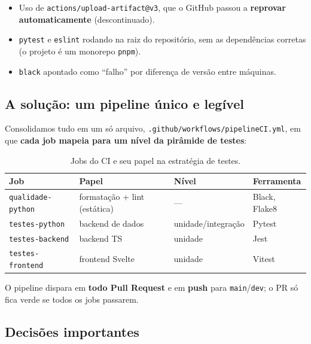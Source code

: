 \documentclass[11pt,a4paper]{article}
\begin{document}
\begin{itemize}[leftmargin=1.4em]
  \item Uso de \texttt{actions/upload-artifact@v3}, que o GitHub passou a
        \textbf{reprovar automaticamente} (descontinuado).
  \item \texttt{pytest} e \texttt{eslint} rodando na raiz do repositório, sem as
        dependências corretas (o projeto é um monorepo \texttt{pnpm}).
  \item \texttt{black} apontado como ``falho'' por diferença de versão entre
        máquinas.
\end{itemize}

\subsection{A solução: um pipeline único e legível}

Consolidamos tudo em um só arquivo,
\texttt{.github/workflows/pipelineCI.yml}, em que \textbf{cada job mapeia para um
nível da pirâmide de testes}:

\begin{table}[h]
\centering
\small
\begin{tabular}{@{}llll@{}}
\toprule
\textbf{Job} & \textbf{Papel} & \textbf{Nível} & \textbf{Ferramenta} \\
\midrule
\texttt{qualidade-python} & formatação + lint (estática) & --- & Black, Flake8 \\
\texttt{testes-python}    & backend de dados             & unidade/integração & Pytest \\
\texttt{testes-backend}   & backend TS                   & unidade & Jest \\
\texttt{testes-frontend}  & frontend Svelte              & unidade & Vitest \\
\bottomrule
\end{tabular}
\caption{Jobs do CI e seu papel na estratégia de testes.}
\end{table}

O pipeline dispara em \textbf{todo Pull Request} e em \textbf{push} para
\texttt{main}/\texttt{dev}; o PR só fica verde se todos os jobs passarem.

\subsection{Decisões importantes}
\end{document}
